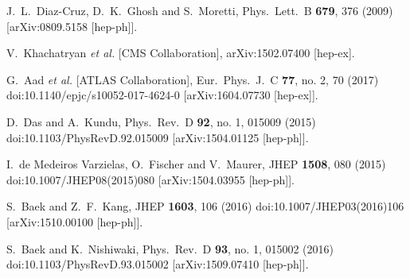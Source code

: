 \documentclass[aps,prd,groupaddress,floatfix,tighten,nofootinbib,showpacs,
amsfonts,superscriptaddress]{revtex4}
\begin{document}
{\begin{thebibliography}{99}
  
  J.~L.~Diaz-Cruz, D.~K.~Ghosh and S.~Moretti,
  Phys.\ Lett.\ B {\bf 679}, 376 (2009)
  [arXiv:0809.5158 [hep-ph]].
  
  V.~Khachatryan {\it et al.}  [CMS Collaboration],
  arXiv:1502.07400 [hep-ex].
  
  G.~Aad {\it et al.} [ATLAS Collaboration],
  Eur.\ Phys.\ J.\ C {\bf 77}, no. 2, 70 (2017)
  doi:10.1140/epjc/s10052-017-4624-0
  [arXiv:1604.07730 [hep-ex]].
 
  D.~Das and A.~Kundu,
  Phys.\ Rev.\ D {\bf 92}, no. 1, 015009 (2015)
  doi:10.1103/PhysRevD.92.015009
  [arXiv:1504.01125 [hep-ph]].
  
  I.~de Medeiros Varzielas, O.~Fischer and V.~Maurer,
  JHEP {\bf 1508}, 080 (2015)
  doi:10.1007/JHEP08(2015)080
  [arXiv:1504.03955 [hep-ph]].
  
  S.~Baek and Z.~F.~Kang,
  JHEP {\bf 1603}, 106 (2016)
  doi:10.1007/JHEP03(2016)106
  [arXiv:1510.00100 [hep-ph]].
 
 
  S.~Baek and K.~Nishiwaki,
  Phys.\ Rev.\ D {\bf 93}, no. 1, 015002 (2016)
  doi:10.1103/PhysRevD.93.015002
  [arXiv:1509.07410 [hep-ph]].
 

\end{thebibliography}}
\end{document}
